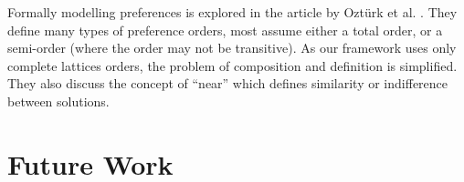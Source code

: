 Formally modelling preferences is explored in the article by Ozt\"urk et al. \cite{Ozturk}.
They define many types of preference orders, most assume either a total order, or a semi-order (where the order may not be transitive).
As our framework uses only complete lattices orders, the problem of composition and definition is simplified. 
They also discuss the concept of ``near'' which defines similarity or indifference between solutions.

\section{Future Work}


